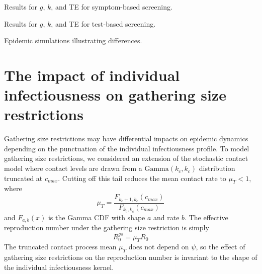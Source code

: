 Results for $g$, $k$, and TE for symptom-based screening. 

Results for $g$, $k$, and TE for test-based screening. 

Epidemic simulations illustrating differences. 


\section{The impact of individual infectiousness on gathering size restrictions}

Gathering size restrictions may have differential impacts on epidemic dynamics depending on the punctuation of the individual infectiousness profile. To model gathering size restrictions, we considered an extension of the stochastic contact model where contact levels are drawn from a $\text{Gamma}(k_c, k_c)$ distribution truncated at $c_{max}$. Cutting off this tail reduces the mean contact rate to $\mu_T < 1$, where 
\begin{equation}
	\mu_T = \frac{F_{k_c+1, k_c}(c_{max})}{F_{k_c, k_c}(c_{max})}
\end{equation}
and $F_{a,b}(x)$ is the Gamma CDF with shape $a$ and rate $b$.  The effective reproduction number under the gathering size restriction is simply 
\begin{equation}
	R_0^{gs} = \mu_T R_0
\end{equation}
The truncated contact process mean $\mu_T$ does not depend on $\psi$, so the effect of gathering size restrictions on the reproduction number is invariant to the shape of the individual infectiousness kernel. 


